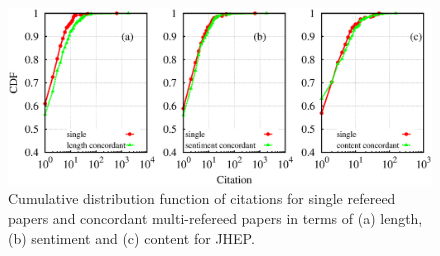 \begin{figure}
 \centering
 \includegraphics[scale = 0.3]{./texfiles/Chapter_4/cikm_17/figures/citation_mul_all.eps}
 \caption{\label{con:citation} Cumulative distribution function of citations for single refereed papers and concordant multi-refereed papers 
 in terms of (a) length, (b) sentiment 
 and (c) content for JHEP. %
 }
\end{figure}

